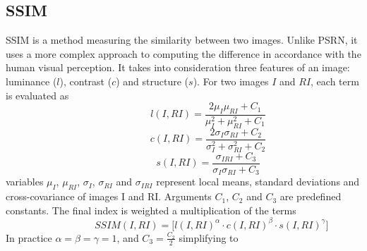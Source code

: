 \subsection{SSIM}
SSIM is a method measuring the similarity between two images. Unlike PSRN, it uses a more complex approach to computing the difference in accordance with the human visual perception. It takes into consideration three features of an image: luminance ($l$), contrast ($c$) and structure ($s$). For two images $I$ and $RI$, each term is evaluated as
\begin{equation} \label{eq:Lumi}
\hspace{3em} \hspace{3em} \hspace{3em} l(I,RI)= \frac{2\mu_{I} \mu_{RI} + C_1}{\mu_{I}^2 + \mu_{RI}^2 + C_1} \enspace \enspace \hspace{3em}
\end{equation}
\begin{equation} \label{eq:contra}
\hspace{3em} \hspace{3em} \hspace{3em} c(I,RI)= \frac{2\sigma_{I} \sigma_{RI} + C_2}{\sigma_{I}^2 + \sigma_{RI}^2 + C_2} \enspace \enspace \hspace{3em}
\end{equation}
\begin{equation} \label{eq:Struct}
\hspace{3em} \hspace{3em} \hspace{3em} s(I,RI)= \frac{\sigma_{IRI} + C_3}{\sigma_{I} \sigma_{RI} + C_3} \enspace \enspace \hspace{3em}
\end{equation}
variables $\mu_{I}$, $\mu_{RI}$, $\sigma_{I}$, $\sigma_{RI}$ and $\sigma_{IRI}$ represent local means, standard deviations and cross-covariance of images I and RI. Arguments $C_1$, $C_2$ and $C_3$ are predefined constants. The final index is weighted a multiplication of the terms
\begin{equation} \label{eq:ssim1}
\hspace{3em} \hspace{3em} \hspace{3em} SSIM(I,RI)= \big[ l(I,RI)^{\alpha} \cdot c(I,RI)^{\beta} \cdot s(I,RI)^{\gamma} \big]   \enspace \enspace \hspace{3em}
\end{equation}
In practice $\alpha = \beta = \gamma = 1$, and $C_3 = \frac{C_2}{2}$ simplifying to
